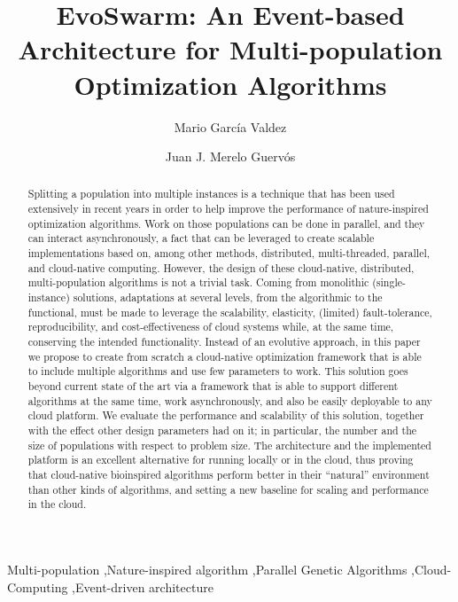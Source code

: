 \documentclass[review]{elsarticle}
\begin{document}
\lstset{language=Python} 
\begin{frontmatter}

\title{EvoSwarm: An Event-based Architecture for Multi-population Optimization Algorithms}

\author[itt]{Mario Garc\'ia Valdez}

\author[granada]{Juan J. Merelo Guerv\'os}

\address[itt]{Department of Graduate Studies, Instituto Tecnol\'ogico de Tijuana, Tijuana BC, Mexico}
\address[granada]{Department of Computer Architecture and Technology, Universidad de Granada, Granada, Spain}

\begin{abstract} 
Splitting a population into multiple instances is a technique that has
been used extensively in recent years in order to help improve the
performance of nature-inspired optimization algorithms. Work on those
populations can be done in parallel, and they can interact asynchronously,
a fact that can be leveraged to create scalable implementations based
on, among other methods, distributed, multi-threaded, parallel, and
cloud-native computing.  However, the design of these cloud-native,
distributed, multi-population algorithms is not a trivial task. Coming
from monolithic (single-instance) solutions, adaptations at several
levels, from the algorithmic to the functional, must be made to
leverage the scalability, elasticity, (limited) fault-tolerance,
reproducibility, and cost-effectiveness of cloud systems while, at the
same time, conserving the intended functionality. Instead of an
evolutive approach, in this paper we propose to create from scratch a
cloud-native optimization framework that is able to include multiple
algorithms and use few parameters to work. This solution goes beyond
current state of the art via a framework that is able to support
different algorithms at the same time, work asynchronously, and also
be easily deployable to any cloud platform. We evaluate the
performance and scalability of this solution, together with the effect
other design parameters had on it; in particular, the number and the
size of populations with respect to problem size. The architecture and
the implemented platform is an excellent alternative for running
locally or in the cloud, thus proving that cloud-native bioinspired
algorithms perform better in their ``natural'' environment than other
kinds of algorithms, %
and setting a new baseline for scaling and
performance in the cloud.
\end{abstract}

\begin{keyword}
Multi-population \sep Nature-inspired algorithm \sep Parallel Genetic Algorithms \sep Cloud-Computing
\sep Event-driven architecture 
\end{keyword}

\end{frontmatter}
\end{document}
